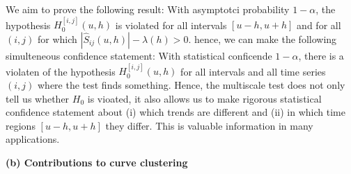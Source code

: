 \documentclass[a4paper,12pt]{article}
\begin{document}
\begin{itemize}[label=--,leftmargin=0.5cm]
\begin{enumerate}[label=(\roman*),leftmargin=0.75cm]
We aim to prove the following result: With asymptotci probability $1-\alpha$, the hypothesis $H_0^{[i,j]}(u,h)$ is violated for all intervals $[u-h,u+h]$ and for all $(i,j)$ for which $|\hat{S}_{ij}(u,h)| - \lambda(h) > 0$. hence, we can make the following simulteneous confidence statement: With statistical conficende $1-\alpha$, there is a violaten of the hypothesis $H_0^{[i,j]}(u,h)$ for all intervals and all time series $(i,j)$ where the test finds something. Hence, the multiscale test does not only tell us whether $H_0$ is vioated, it also allows us to make rigorous statistical confidence statement about (i) which trends are different and (ii) in which time regions $[u-h,u+h]$ they differ. This is valuable information in many applications. 
\end{enumerate}
\vspace{5pt}


\noindent \textbf{(b) Contributions to curve clustering} 
\vspace{10pt} 



\end{itemize}
\end{document}
